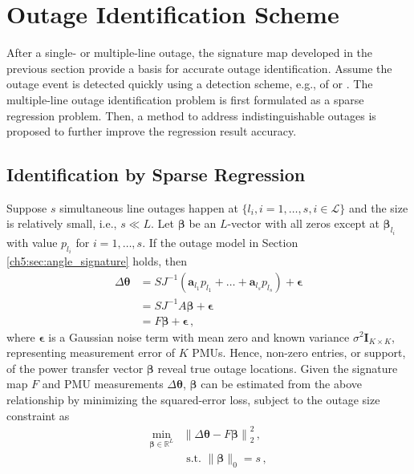 \section{Outage Identification Scheme}
\label{ch5:sec:identification_scheme}
After a single- or multiple-line outage, the signature map developed in the previous section provide a basis for accurate outage identification. Assume the outage event is detected quickly using a detection scheme, e.g., of \cite{yang2020control} or \cite{yang2021particle}. The multiple-line outage identification problem is first formulated as a sparse regression problem. Then, a method to address indistinguishable outages is proposed to further improve the regression result accuracy. 

\subsection{Identification by Sparse Regression}
\label{ch5:sec:sparse_regression}
Suppose $s$ simultaneous line outages happen at $\{l_i, i=1, \dots, s, i \in \mathcal{L}\}$ and the size is relatively small, i.e., $s \ll L$. Let $\boldsymbol{\beta}$ be an $L$-vector with all zeros except at $\boldsymbol{\beta}_{l_i}$ with value $p_{l_i}$ for $i = 1, \dots, s$.
If the outage model in Section \ref{ch5:sec:angle_signature} holds, then
\begin{align}
    \Delta\boldsymbol{\theta} &= S J^{-1} (\mathbf{a}_{l_1} p_{l_1} + \dots + \mathbf{a}_{l_s} p_{l_s}) + \boldsymbol{\epsilon} \nonumber\\
    &= S J^{-1} A \boldsymbol{\beta} + \boldsymbol{\epsilon} \nonumber\\
    &= F \boldsymbol{\beta} + \boldsymbol{\epsilon}  \,,
\end{align}
where $\boldsymbol{\epsilon}$ is a Gaussian noise term with mean zero and known variance $\sigma^2 \textbf{I}_{K\times K}$, representing measurement error of $K$ PMUs. Hence, non-zero entries, or support, of the power transfer vector $\boldsymbol{\beta}$ reveal true outage locations. Given the signature map $F$ and PMU measurements $\Delta\boldsymbol{\theta}$, $\boldsymbol{\beta}$ can be estimated from the above relationship by minimizing the squared-error loss, subject to the outage size constraint as
\begin{align}
\label{ch5:eqn:l_0_formulation}
\underset{\boldsymbol{\beta} \in \mathbb{R}^{L}}{\min} &\left\|\Delta\boldsymbol{\theta} - F\boldsymbol{\beta}\right\|_{2}^{2} \,, \\
& \text { s.t. }\|\boldsymbol{\beta}\|_{0} = s \nonumber\,,
\end{align}
